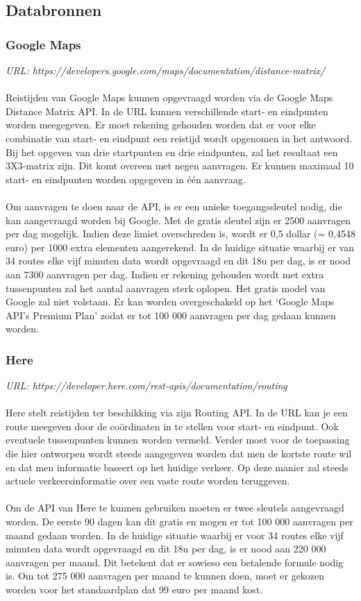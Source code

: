 \documentclass[ps,a4paper,oneside]{report}
\begin{document}
\subsection{Databronnen}
\subsubsection{Google Maps}
\textit{URL: https://developers.google.com/maps/documentation/distance-matrix/}\\\\
Reistijden van Google Maps kunnen opgevraagd worden via de Google Maps Distance Matrix API. In de URL kunnen verschillende start- en eindpunten worden meegegeven. Er moet rekening gehouden worden dat er voor elke combinatie van start- en eindpunt een reistijd wordt opgenomen in het antwoord. Bij het opgeven van drie startpunten en drie eindpunten, zal het resultaat een 3X3-matrix zijn. Dit komt overeen met negen aanvragen. Er kunnen maximaal 10 start- en eindpunten worden opgegeven in \'e\'en aanvraag.\\\\
Om aanvragen te doen naar de API, is er een unieke toegangssleutel nodig, die kan aangevraagd worden bij Google. Met de gratis sleutel zijn er 2500 aanvragen per dag mogelijk. Indien deze limiet overschreden is, wordt er 0,5 dollar (= 0,4548 euro)  per 1000 extra elementen aangerekend. In de huidige situatie waarbij er van 34 routes elke vijf minuten data wordt opgevraagd en dit 18u per dag, is er nood aan 7300 aanvragen per dag. Indien er rekening gehouden wordt met extra tussenpunten zal het aantal aanvragen sterk oplopen. Het gratis model van Google zal niet volstaan. Er kan worden overgeschakeld op het ‘Google Maps API's Premium Plan’ zodat er tot 100 000 aanvragen per dag gedaan kunnen worden.

\subsubsection{Here}
\textit{URL: https://developer.here.com/rest-apis/documentation/routing}\\\\
Here stelt reistijden ter beschikking via zijn Routing API. In de URL kan je een route meegeven door de co\"ordinaten in te stellen voor start- en eindpunt. Ook eventuele tussenpunten kunnen worden vermeld. Verder moet voor de toepassing die hier ontworpen wordt steeds aangegeven worden dat men de kortste route wil en dat men informatie baseert op het huidige verkeer. Op deze manier zal steeds actuele verkeersinformatie over een vaste route worden teruggeven.\\\\
Om de API van Here te kunnen gebruiken moeten er twee sleutels aangevraagd worden. De eerste 90 dagen kan dit gratis en mogen er tot 100 000 aanvragen per maand gedaan worden. In de huidige situatie waarbij er voor 34 routes elke vijf minuten data wordt opgevraagd en dit 18u per dag, is er nood aan 220 000 aanvragen per maand. Dit betekent dat er sowieso een betalende formule nodig is. Om tot 275 000 aanvragen per maand te kunnen doen, moet er gekozen worden voor het standaardplan dat 99 euro per maand kost.
\clearpage
\end{document}

